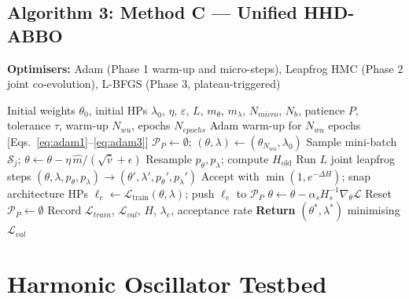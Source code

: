 \documentclass[11pt]{article}
\theoremstyle{definition}
\newcommand{\calB}{\mathcal{P}}
\begin{document}
\subsection{Algorithm 3: Method C --- Unified HHD-ABBO}
\begin{algorithm}[H]
\caption{Method C --- Unified HHD-ABBO}
\label{alg:unified}
\textbf{Optimisers:} Adam (Phase 1 warm-up and micro-steps),
Leapfrog HMC (Phase 2 joint co-evolution),
L-BFGS (Phase 3, plateau-triggered)
\begin{algorithmic}[1]
\Require Initial weights $\theta_0$, initial HPs $\lambda_0$,
         $\eta$, $\varepsilon$, $L$, $m_\theta$, $m_\lambda$,
         $N_{micro}$, $N_b$, patience $P$, tolerance $\tau$,
         warm-up $N_{wu}$, epochs $N_{epochs}$
\State Adam warm-up for $N_{wu}$ epochs [Eqs.~\eqref{eq:adam1}--\eqref{eq:adam3}]
\State $\calB_P \leftarrow \emptyset$;
       $(\theta, \lambda) \leftarrow (\theta_{N_{wu}}, \lambda_0)$
    \State Sample mini-batch $\mathcal{S}_j$;
      $\theta \leftarrow \theta
        - \eta\,\hat{m}/(\sqrt{\hat{v}}+\epsilon)$
  \EndFor
  \State Resample $p_\theta, p_\lambda$; compute $H_{\mathrm{old}}$
    \hfill{}
  \State Run $L$ joint leapfrog steps
    $(\theta,\lambda,p_\theta,p_\lambda)\to(\theta',\lambda',p_\theta',p_\lambda')$
  \State Accept with $\min(1,e^{-\Delta H})$; snap architecture HPs
  \State $\ell_e \leftarrow \mathcal{L}_{\mathrm{train}}(\theta,\lambda)$;
    push $\ell_e$ to $\calB_P$
  \If{$|\calB_P|\ge P$ \textbf{and}
      $(\ell_{e-P}-\ell_e)/\ell_{e-P} < \tau$}
      \State $\theta \leftarrow \theta
        - \alpha_s H_s^{-1}\nabla_\theta\mathcal{L}$
    \EndFor
    \State Reset $\calB_P \leftarrow \emptyset$
  \EndIf
  \State Record $\mathcal{L}_{train}$, $\mathcal{L}_{val}$,
    $H$, $\lambda_e$, acceptance rate
\EndFor
\State \textbf{Return} $(\theta^*, \lambda^*)$ minimising $\mathcal{L}_{val}$
\end{algorithmic}
\end{algorithm}


\section{Harmonic Oscillator Testbed}
\end{document}
